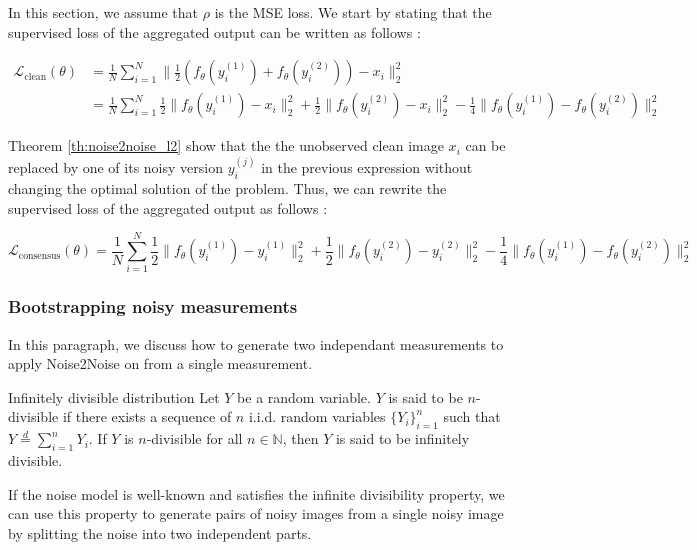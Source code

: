 In this section, we assume that $\rho$ is the MSE loss.
We start by stating that the supervised loss of the aggregated output can be written as follows :

\begin{align*}
    \mathcal{L}_{\text{clean}}(\theta) &= \frac{1}{N} \sum_{i=1}^N \| \frac{1}{2}(f_\theta(y_i^{(1)}) + f_\theta(y_i^{(2)})) -  x_i \|_2^2 \\
    &= \frac{1}{N} \sum_{i=1}^N \frac{1}{2} \| f_{\theta}(y_i^{(1)}) - x_i \|_2^2 + \frac{1}{2} \| f_{\theta}(y_i^{(2)}) - x_i \|_2^2 - \frac{1}{4} \| f_{\theta}(y_i^{(1)}) - f_{\theta}(y_i^{(2)}) \|_2^2
\end{align*}

Theorem \ref{th:noise2noise_l2} show that the the unobserved clean image $x_i$ can be replaced by one of its noisy version $y_i^{(j)}$ in the previous expression without changing the optimal solution of the problem.
Thus, we can rewrite the supervised loss of the aggregated output as follows :

\begin{equation}
    \mathcal{L}_{\text{consensus}}(\theta) = \frac{1}{N} \sum_{i=1}^N \frac{1}{2} \| f_{\theta}(y_i^{(1)}) - y_i^{(1)} \|_2^2 + \frac{1}{2} \| f_{\theta}(y_i^{(2)}) - y_i^{(2)} \|_2^2 - \frac{1}{4} \| f_{\theta}(y_i^{(1)}) - f_{\theta}(y_i^{(2)}) \|_2^2
    \label{eq:consensus_loss}
\end{equation}

\subsubsection{Bootstrapping noisy measurements}

In this paragraph, we discuss how to generate two independant measurements to apply Noise2Noise on from a single measurement.

\begin{definition}{Infinitely divisible distribution}
    Let $Y$ be a random variable. $Y$ is said to be $n$-divisible if there exists a sequence of $n$ i.i.d. random variables $\{Y_i\}_{i=1}^n$ such that $Y \stackrel{d}{=} \sum_{i=1}^n Y_i$. If $Y$ is $n$-divisible for all $n \in \mathbb{N}$, then $Y$ is said to be infinitely divisible.
\end{definition}

If the noise model is well-known and satisfies the infinite divisibility property, we can use this property to generate pairs of noisy images from a single noisy image by splitting the noise into two independent parts.


